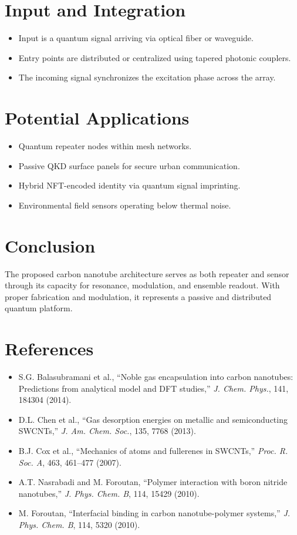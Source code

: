 \documentclass[11pt]{article}
\begin{document}
	\section{Input and Integration}
	\begin{itemize}
		\item Input is a quantum signal arriving via optical fiber or waveguide.
		\item Entry points are distributed or centralized using tapered photonic couplers.
		\item The incoming signal synchronizes the excitation phase across the array.
	\end{itemize}
	
	\section{Potential Applications}
	\begin{itemize}
		\item Quantum repeater nodes within mesh networks.
		\item Passive QKD surface panels for secure urban communication.
		\item Hybrid NFT-encoded identity via quantum signal imprinting.
		\item Environmental field sensors operating below thermal noise.
	\end{itemize}
	
	\section{Conclusion}
	The proposed carbon nanotube architecture serves as both repeater and sensor through its capacity for resonance, modulation, and ensemble readout. With proper fabrication and modulation, it represents a passive and distributed quantum platform.
	
	\section{References}
	\begin{itemize}
		\item S.G. Balasubramani et al., ``Noble gas encapsulation into carbon nanotubes: Predictions from analytical model and DFT studies,'' \textit{J. Chem. Phys.}, 141, 184304 (2014).
		\item D.L. Chen et al., ``Gas desorption energies on metallic and semiconducting SWCNTs,'' \textit{J. Am. Chem. Soc.}, 135, 7768 (2013).
		\item B.J. Cox et al., ``Mechanics of atoms and fullerenes in SWCNTs,'' \textit{Proc. R. Soc. A}, 463, 461–477 (2007).
		\item A.T. Nasrabadi and M. Foroutan, ``Polymer interaction with boron nitride nanotubes,'' \textit{J. Phys. Chem. B}, 114, 15429 (2010).
		\item M. Foroutan, ``Interfacial binding in carbon nanotube-polymer systems,'' \textit{J. Phys. Chem. B}, 114, 5320 (2010).
	\end{itemize}
	
\end{document}
